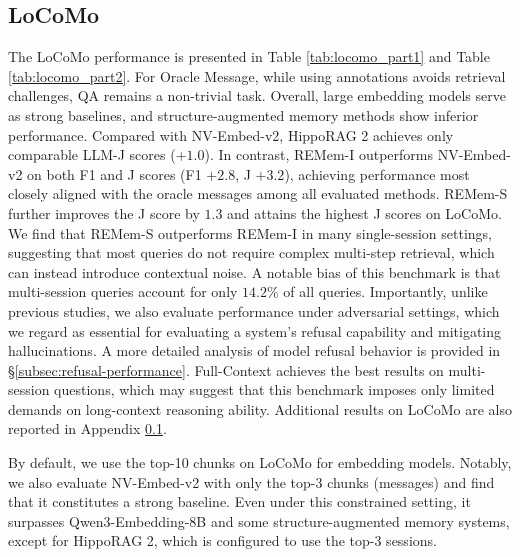 \documentclass{article} %
\newcommand{\ours}{REMem\xspace}
\begin{document}
\subsection{LoCoMo}
\label{subsec:results-on-locomo}

The LoCoMo performance is presented in Table \ref{tab:locomo_part1} and Table \ref{tab:locomo_part2}. 
For Oracle Message, while using annotations avoids retrieval challenges, QA remains a non-trivial task.
Overall, large embedding models serve as strong baselines, and structure-augmented memory methods show inferior performance. 
Compared with NV-Embed-v2, HippoRAG 2 achieves only comparable LLM-J scores ($+1.0$). 
In contrast, \ours-I outperforms NV-Embed-v2 on both F1 and J scores (F1 $+2.8$, J $+3.2$), achieving performance most closely aligned with the oracle messages among all evaluated methods.
\ours-S further improves the J score by $1.3$ and attains the highest J scores on LoCoMo. 
We find that \ours-S outperforms \ours-I in many single-session settings, suggesting that most queries do not require complex multi-step retrieval, which can instead introduce contextual noise. 
A notable bias of this benchmark is that multi-session queries account for only $14.2\%$ of all queries.
Importantly, unlike previous studies, we also evaluate performance under adversarial settings, which we regard as essential for evaluating a system’s refusal capability and mitigating hallucinations.
A more detailed analysis of model refusal behavior is provided in \S \ref{subsec:refusal-performance}.
Full-Context achieves the best results on multi-session questions, which may suggest that this benchmark imposes only limited demands on long-context reasoning ability.
Additional results on LoCoMo are also reported in Appendix \ref{subsec:results-on-locomo}.

By default, we use the top-10 chunks on LoCoMo for embedding models. Notably, we also evaluate NV-Embed-v2 with only the top-3 chunks (messages) and find that it constitutes a strong baseline. Even under this constrained setting, it surpasses Qwen3-Embedding-8B and some structure-augmented memory systems, except for HippoRAG 2, which is configured to use the top-3 sessions.
\end{document}
